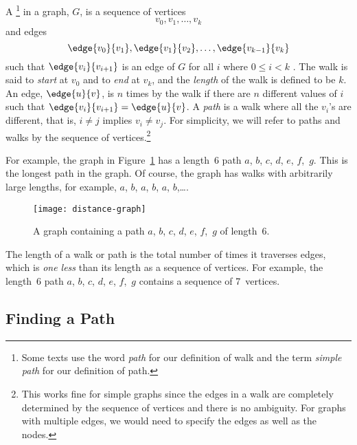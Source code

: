 \begin{definition}\label{def:undirected-path}
A \footnote{Some texts use the word \emph{path} for our
  definition of walk and the term \emph{simple path} for our
  definition of path.} in a graph, $G$, is a sequence of vertices
\begin{equation*}
v_0, v_1, \dots, v_k
\end{equation*}
and edges
\begin{equation*}
    \edge{v_0}{v_1}, \edge{v_1}{v_2}, \dots, \edge{v_{k - 1}}{v_k}
\end{equation*}
such that $\edge{v_i}{v_{i+1}}$ is an edge of $G$ for all $i$ where $0
\leq i < k$ .  The walk is said to \emph{start}
at $v_0$ and to \emph{end} at $v_k$, and the
\emph{length} of the walk is defined to be $k$.
An edge, $\edge{u}{v}$, is  $n$ times by the walk if
there are $n$ different values of $i$ such that $\edge{v_i}{v_{i+1}} =
\edge{u}{v}$.  A \emph{path} is a walk where all the $v_i$'s are
different, that is, $i\neq j$ implies $v_i \neq v_j$.  For simplicity,
we will refer to paths and walks by the sequence of
vertices.\footnote{This works fine for simple graphs since the edges
  in a walk are completely determined by the sequence of vertices and
  there is no ambiguity.  For graphs with multiple edges, we would
  need to specify the edges as well as the nodes.}
\end{definition}

For example, the graph in Figure~\ref{dg} has a length~6 path $a$,
$b$, $c$, $d$, $e$, $f$,~$g$.  This is the longest path in the graph.
Of course, the graph has walks with arbitrarily large lengths, for
example, $a$, $b$, $a$, $b$, $a$, $b$,\dots.

\begin{figure}[htbp]\redrawn

\texttt{[image: distance-graph]}

\caption{A graph containing a path $a$, $b$, $c$, $d$, $e$, $f$,~$g$
  of length~6.}
\label{dg}
\end{figure}

The length of a walk or path is the total number of times it traverses
edges, which is \emph{one less} than its length as a sequence of
vertices.  For example, the length~6 path $a$, $b$, $c$, $d$, $e$,
$f$,~$g$ contains a sequence of 7~vertices.

\subsection{Finding a Path}


